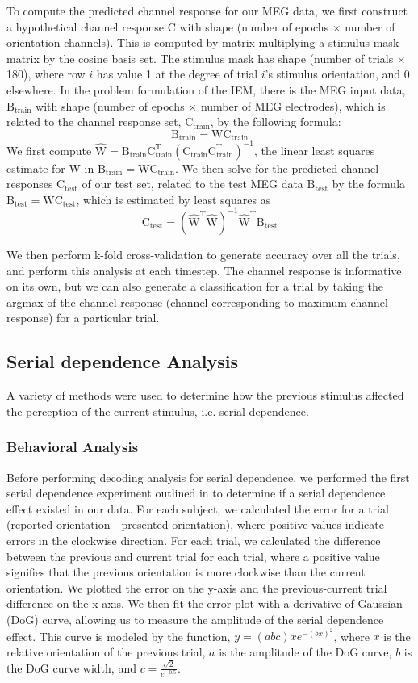 \documentclass[../main.tex]{subfiles}
\begin{document}
To compute the predicted channel response for our MEG data, we first construct a hypothetical channel
response $\mathrm{C}$ with shape (number of epochs $\times$ number of orientation channels). This is computed by matrix multiplying a stimulus mask matrix by the cosine basis set. The stimulus mask has shape (number of trials $\times$ 180), where row $i$ has value 1 at the degree of trial $i$'s stimulus orientation, and 0 elsewhere. In the problem formulation of the IEM, there is the MEG input data, $\mathrm{B_{train}}$ with shape (number of epochs $\times$ number of MEG electrodes), which is related to the channel response set, $\mathrm{C_{train}}$, by the following formula:
$$ \mathrm{B_{train} = W C_{train}}$$
We first compute $\mathrm{\hat{W} = B_{train} C_{train}^T (C_{train} C_{train}^T)^{-1}}$, the linear least squares estimate for W in $ \mathrm{B_{train} = W C_{train}}$. We then solve for the predicted channel responses $\mathrm{C_{test}}$  of our test set, related to the test MEG data $\mathrm{B_{test}}$ by the formula $\mathrm{B_{test} = W C_{test}}$, which is estimated by least squares as 
$$\mathrm{C_{test} = (\hat{W}^T \hat{W})^{-1} \hat{W}^T B_{test}}$$

We then perform k-fold cross-validation to generate accuracy over all the trials, and perform this analysis at each timestep. The channel response is informative on its own, but we can also generate a classification for a trial by taking the argmax of the channel response (channel corresponding to maximum channel response) for a particular trial.

\subsection{Serial dependence Analysis}
A variety of methods were used to determine how the previous stimulus affected the perception of the current stimulus, i.e. serial dependence. 

\subsubsection{Behavioral Analysis}
Before performing decoding analysis for serial dependence, we performed the first serial dependence experiment outlined in \cite{fischer_whitney_2014} to determine if a serial dependence effect existed in our data. For each subject, we calculated the error for a trial (reported orientation - presented orientation), where positive values indicate errors in the clockwise direction. For each trial, we calculated the difference between the previous and current trial for each trial, where a positive value signifies that the previous orientation is more clockwise than the current orientation. We plotted the error on the y-axis and the previous-current trial difference on the x-axis. We then fit the error plot with a derivative of Gaussian (DoG) curve, allowing us to measure the amplitude of the serial dependence effect. This curve is modeled by the function, $y = (a b c) x e^{-(b x)^2}$, where $x$ is the relative orientation of the previous trial, $a$ is the amplitude of the DoG curve, $b$ is the DoG curve width, and
$c = \frac{\sqrt{2}}{e^{-0.5}}$.
\end{document}
